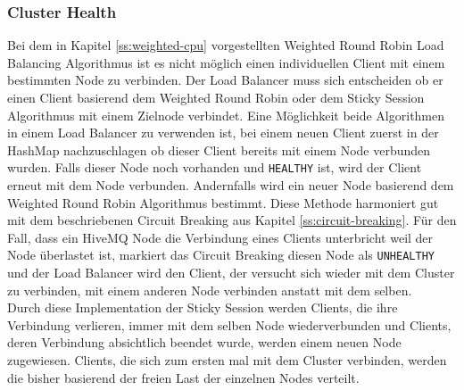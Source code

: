 \subsubsection{Cluster Health}
Bei dem in Kapitel \ref{ss:weighted-cpu} vorgestellten Weighted Round Robin Load Balancing Algorithmus ist es nicht möglich einen individuellen Client mit einem bestimmten Node zu verbinden. Der Load Balancer muss sich entscheiden ob er einen Client basierend dem Weighted Round Robin oder dem Sticky Session Algorithmus mit einem Zielnode verbindet.
Eine Möglichkeit beide Algorithmen in einem Load Balancer zu verwenden ist, bei einem neuen Client zuerst in der HashMap nachzuschlagen ob dieser Client bereits mit einem Node verbunden wurden. Falls dieser Node noch vorhanden und \verb|HEALTHY| ist, wird der Client erneut mit dem Node verbunden. Andernfalls wird ein neuer Node basierend dem Weighted Round Robin Algorithmus bestimmt.
Diese Methode harmoniert gut mit dem beschriebenen Circuit Breaking aus Kapitel \ref{ss:circuit-breaking}. Für den Fall, dass ein HiveMQ Node die Verbindung eines Clients unterbricht weil der Node überlastet ist, markiert das Circuit Breaking diesen Node als \verb|UNHEALTHY| und der Load Balancer wird den Client, der versucht sich wieder mit dem Cluster zu verbinden, mit einem anderen Node verbinden anstatt mit dem selben.
\\
Durch diese Implementation der Sticky Session werden Clients, die ihre Verbindung verlieren, immer mit dem selben Node wiederverbunden und Clients, deren Verbindung absichtlich beendet wurde, werden einem neuen Node zugewiesen. Clients, die sich zum ersten mal mit dem Cluster verbinden, werden die bisher basierend der freien Last der einzelnen Nodes verteilt.

